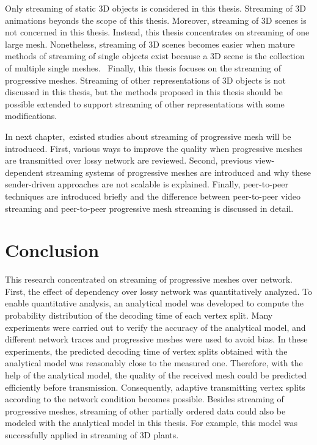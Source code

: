 \documentclass[11pt, a4paper]{report}
\begin{document}
    Only streaming of static 3D objects is considered in this thesis. 
    Streaming of 3D animations beyonds the scope of this thesis. 
    Moreover, streaming of 3D scenes is not concerned in this thesis.
    Instead, this thesis concentrates on streaming of one large mesh.
    Nonetheless, streaming of 3D scenes becomes easier when mature methods
    of streaming of single objects exist because a 3D scene is the collection
    of multiple single meshes. 
    Finally, this thesis focuses on the streaming of progressive meshes. 
    Streaming of other representations of 3D objects is not discussed in this thesis,
    but the methods proposed in this thesis should be possible
    extended to support streaming of other representations with some modifications.

    In next chapter, existed studies about streaming of progressive mesh
    will be introduced. 
    First, various ways to improve the quality when progressive meshes are transmitted
    over lossy network are reviewed.
    Second, previous view-dependent streaming systems of progressive meshes are introduced
    and why these sender-driven approaches are not scalable is explained. 
    Finally, peer-to-peer techniques are introduced briefly
    and the difference between peer-to-peer video streaming
    and peer-to-peer progressive mesh streaming is discussed in detail. 





\chapter{Conclusion}
\label{c:conclusion}
This research concentrated on streaming of progressive meshes over network. 
First, the effect of dependency over lossy network was quantitatively analyzed. 
To enable quantitative analysis, an analytical model was developed to compute 
the probability distribution of the decoding time of each vertex split. 
Many experiments were carried out to verify the accuracy of the analytical model, 
and different network traces and progressive meshes were used to avoid bias. 
In these experiments, the predicted decoding time of vertex splits obtained 
with the analytical model was reasonably close to the measured one. 
Therefore, with the help of the analytical model, 
the quality of the received mesh could be predicted efficiently before transmission.
Consequently, adaptive transmitting vertex splits according to the network condition
becomes possible. Besides streaming of progressive meshes, 
streaming of other partially ordered data could also be modeled
with the analytical model in this thesis. 
For example, this model was successfully applied in streaming of 3D plants.
\end{document}
